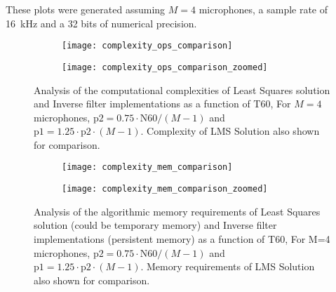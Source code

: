 These plots were generated assuming $M=4$ microphones, a sample rate of \qty{16}{\kilo\hertz} and a 32 bits of numerical precision.

\begin{figure}[H]
	\centering
	\begin{subfigure}[b]{0.45\textwidth}
		\centering
		\texttt{[image: complexity\_ops\_comparison]}
	\end{subfigure}
	\hfill
	\begin{subfigure}[b]{0.45\textwidth}
		\centering
		\texttt{[image: complexity\_ops\_comparison\_zoomed]}
	\end{subfigure}
	\caption{Analysis of the computational complexities of Least Squares solution and Inverse filter implementations as a function of T60, For $M=4$ microphones, $\mathrm{p2} = 0.75 \cdot \mathrm{N60}/(M-1)$ and $\mathrm{p1} = 1.25 \cdot \mathrm{p2} \cdot (M-1)$. Complexity of LMS Solution also shown for comparison.}
	\label{fig:complexity_operations}
\end{figure}

\begin{figure}[H]
	\centering
	\begin{subfigure}[b]{0.45\textwidth}
		\centering
		\texttt{[image: complexity\_mem\_comparison]}
	\end{subfigure}
	\hfill
	\begin{subfigure}[b]{0.45\textwidth}
		\centering
		\texttt{[image: complexity\_mem\_comparison\_zoomed]}
	\end{subfigure}
	\caption{Analysis of the algorithmic memory requirements  of Least Squares solution (could be temporary memory) and Inverse filter implementations (persistent memory) as a function of T60, For M=4 microphones, $\mathrm{p2} = 0.75 \cdot \mathrm{N60}/(M-1)$ and $\mathrm{p1} = 1.25 \cdot \mathrm{p2} \cdot (M-1)$. Memory requirements of LMS Solution also shown for comparison.}
	\label{fig:complexity_memory}
\end{figure}

